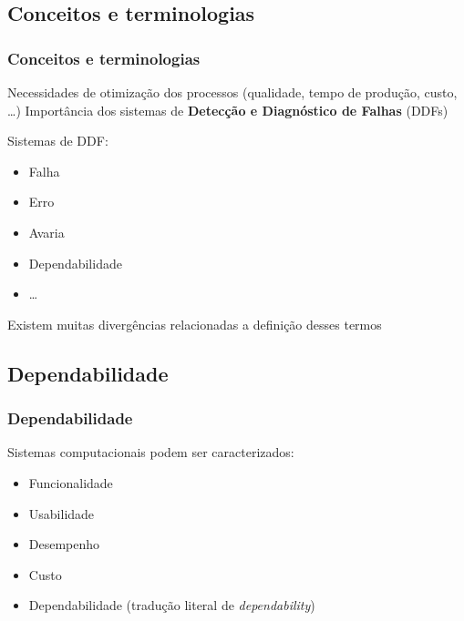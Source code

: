\documentclass{beamer}
\begin{document}
\subsection{Conceitos e terminologias}
\begin{frame}
    \frametitle{Conceitos e terminologias}

    Necessidades de otimização dos processos (qualidade, tempo de produção,
    custo, \ldots) \implica Importância dos sistemas de {\bf Detecção e 
    Diagnóstico de Falhas} (DDFs)

    \vspace{0.25cm}
    
    Sistemas de DDF:

\begin{itemize}
    \item Falha
    \item Erro
    \item Avaria
    \item Dependabilidade
    \item \ldots
\end{itemize}

    Existem muitas divergências relacionadas a definição desses termos
\end{frame}

\subsection{Dependabilidade}
\begin{frame}
    \frametitle{Dependabilidade}

    Sistemas computacionais podem ser caracterizados:

\begin{itemize}
    \item Funcionalidade
    \item Usabilidade
    \item Desempenho
    \item Custo
    \item \alert{Dependabilidade} (tradução literal de {\it dependability})
\end{itemize}

\end{frame}
\end{document}
